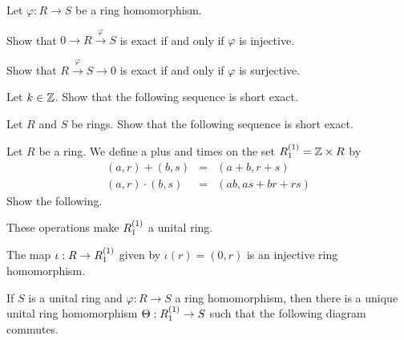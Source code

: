 \begin{exercise}
Let \(\varphi : R \rightarrow S\) be a ring homomorphism.
\begin{proplist*}
\item Show that \(0 \rightarrow R \overset{\varphi}{\rightarrow} S\) is exact if and only if \(\varphi\) is injective.
\item Show that \(R \overset{\varphi}{\rightarrow} S \rightarrow 0\) is exact if and only if \(\varphi\) is surjective.
\end{proplist*}
\end{exercise}

\begin{exercise}
Let \(k \in \mathbb{Z}\).
Show that the following sequence is short exact.
\begin{center}
\end{center}
\end{exercise}

\begin{exercise}
Let \(R\) and \(S\) be rings.
Show that the following sequence is short exact.
\begin{center}
\end{center}
\end{exercise}

\begin{exercise}\label{exerc:adj-unit}
Let \(R\) be a ring.
We define a plus and times on the set \({R}^{(1)}_{1} = \mathbb{Z} \times R\) by
\begin{eqnarray*}
(a,r) + (b,s) & = & (a+b,r+s) \\
(a,r) \cdot (b,s) & = & (ab, as + br + rs)
\end{eqnarray*}
Show the following.
\begin{proplist}
\item These operations make \({R}^{(1)}_{1}\) a unital ring.
\item The map \(\iota : R \rightarrow {R}^{(1)}_{1}\) given by \(\iota(r) = (0,r)\) is an injective ring homomorphism.
\item If \(S\) is a unital ring and \(\varphi : R \rightarrow S\) a ring homomorphism, then there is a unique unital ring homomorphism \(\Theta : {R}^{(1)}_{1} \rightarrow S\) such that the following diagram commutes.
\begin{center}
\end{center}
\end{proplist}
\end{exercise}

